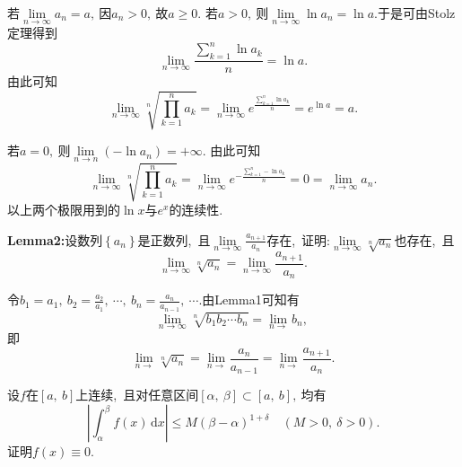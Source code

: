 	\begin{solution}
		若$\lim\limits_{n\rightarrow\infty}a_n=a,\ $因$a_n>0,\ $故$a\ge 0.$
		若$a>0,\ $则$\lim\limits_{n\rightarrow\infty}\ln a_n=\ln a.$于是可由Stolz定理得到
		$$\lim\limits_{n\rightarrow\infty}\frac{\sum\limits_{k=1}^{n}\ln a_k}{n}=\ln a.$$
		由此可知
		$$\lim\limits_{n\rightarrow\infty}\sqrt[n]{\prod\limits _{k=1}^{n}a_k}=\lim\limits_{n\rightarrow\infty}e^{\frac{\sum\limits_{k=1}^{n}\ln a_k}{n}}=e^{\ln a}=a.$$
		
		若$a=0,\ $则$\lim\limits_{n\rightarrow n}(-\ln a_n)=+\infty.$
		由此可知
		$$\lim\limits_{n\rightarrow\infty}\sqrt[n]{\prod\limits _{k=1}^{n}a_k}=\lim\limits_{n\rightarrow\infty}e^{-\frac{\sum\limits_{k=1}^{n}-\ln a_k}{n}}=0=\lim\limits_{n\rightarrow\infty}a_n.$$
		以上两个极限用到的$\ln x$与$e^x$的连续性. 
	\end{solution}
	
	\begin{problem}
		\textbf{Lemma2:}设数列$\left\{a_n\right\}$是正数列,\ 且$\lim\limits_{n\rightarrow\infty}\frac{a_{n+1}}{a_n}$存在,\ 证明:$\lim\limits_{n\rightarrow\infty}\sqrt[n]{a_n}$也存在,\ 且
		$$\lim\limits_{n\rightarrow\infty}\sqrt[n]{a_n}=\lim\limits_{n\rightarrow\infty}\frac{a_{n+1}}{a_n}.$$
	\end{problem}
	
	\begin{solution}
		令$b_1=a_1,\ b_2=\frac{a_2}{a_1},\ \cdots,\ b_n=\frac{a_n}{a_{n-1}},\ \cdots.$由Lemma1可知有
		$$\lim\limits_{n\rightarrow\infty}\sqrt[n]{b_1b_2\cdots b_n}=\lim\limits_{n\rightarrow}b_n,\ $$
		即
		$$\lim\limits_{n\rightarrow}\sqrt[n]{a_n}=\lim\limits_{n\rightarrow}\frac{a_n}{a_{n-1}}=\lim\limits_{n\rightarrow}\frac{a_{n+1}}{a_n}.$$ 
	\end{solution}
	\newpage
	\begin{problem}
		设$f$在$\left[a,\ b\right]$上连续,\ 且对任意区间$\left[\alpha,\ \beta\right]\subset \left[a,\ b\right],\ $均有
		$$\left|\int_{\alpha}^{\beta}f(x)\,\text{d}x\right|\le M\left(\beta -\alpha\right)^{1+\delta}\quad\left(M>0,\ \delta >0\right).$$
		证明$f(x)\equiv0.$
	\end{problem}
	
